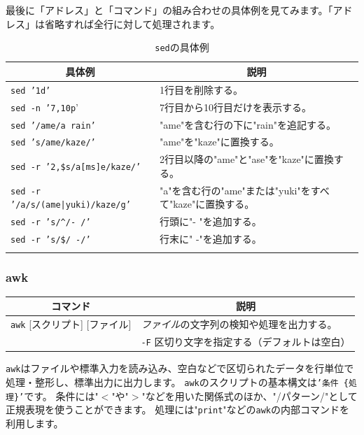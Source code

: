 \documentclass[a4j]{ltjsreport}
\begin{document}
    最後に「アドレス」と「コマンド」の組み合わせの具体例を見てみます。「アドレス」は省略すれば全行に対して処理されます。
    \begin{longtable}[c]{|l|l|}
        \hline
        \multicolumn{1}{|c|}{\textbf{具体例}}&\multicolumn{1}{|c|}{\textbf{説明}}\\
        \hline\hline
        \texttt{sed '1d'} & 1行目を削除する。\\
        \hline
        \texttt{sed -n '7,10p}' & 7行目から10行目だけを表示する。\\
        \hline
        \texttt{sed '/ame/a rain'} & "ame"を含む行の下に"rain"を追記する。\\
        \hline
        \texttt{sed 's/ame/kaze/'} & "ame"を"kaze"に置換する。\\
        \hline
        \texttt{sed -r '2,\$s/a[ms]e/kaze/'} & 2行目以降の"ame"と"ase"を"kaze"に置換する。\\
        \hline
        \texttt{sed -r '/a/s/(ame|yuki)/kaze/g'} & "a"を含む行の"ame"または"yuki"をすべて"kaze"に置換する。\\
        \hline
        \texttt{sed -r 's/\textasciicircum/- /'} & 行頭に"- "を追加する。\\
        \hline
        \texttt{sed -r 's/\$/ -/'} & 行末に" -"を追加する。   \\
        \hline
        \caption{\texttt{sed}の具体例}
    \end{longtable}


    \subsubsection{awk} 

    \begin{longtable}[c]{|p{3.5cm}|p{13.5cm}|}
        \hline
        \multicolumn{1}{|c|}{\textbf{コマンド}}&\multicolumn{1}{|c|}{\textbf{説明}}\\
        \hline\hline
        \texttt{awk} {\footnotesize [スクリプト] [ファイル]} &\emph{ファイル}の文字列の検知や処理を出力する。 \\
        &\texttt{-F} 区切り文字を指定する（デフォルトは空白）\\
        \hline
    \end{longtable}

    \texttt{awk}はファイルや標準入力を読み込み、空白などで区切られたデータを行単位で処理・整形し、標準出力に出力します。
    \texttt{awk}のスクリプトの基本構文は\texttt{'条件 \{処理\}'}です。
    条件には"$<$"や"$>$"などを用いた関係式のほか、"/パターン/"として正規表現を使うことができます。
    処理には"\texttt{print}"などの\texttt{awk}の内部コマンドを利用します。
\end{document}
